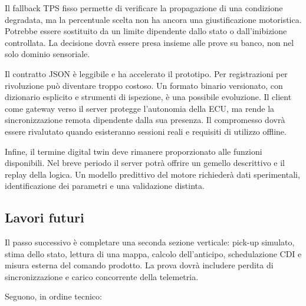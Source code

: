 \documentclass{article}
\begin{document}
Il fallback TPS fisso permette di verificare la propagazione di una condizione
degradata, ma la percentuale scelta non ha ancora una giustificazione
motoristica. Potrebbe essere sostituito da un limite dipendente dallo stato o
dall'inibizione controllata. La decisione dovrà essere presa insieme alle prove
su banco, non nel solo dominio sensoriale.

Il contratto JSON è leggibile e ha accelerato il prototipo. Per registrazioni
per rivoluzione può diventare troppo costoso. Un formato binario versionato,
con dizionario esplicito e strumenti di ispezione, è una possibile evoluzione.
Il client come gateway verso il server protegge l'autonomia della ECU, ma rende
la sincronizzazione remota dipendente dalla sua presenza. Il compromesso dovrà
essere rivalutato quando esisteranno sessioni reali e requisiti di utilizzo
offline.

Infine, il termine digital twin deve rimanere proporzionato alle funzioni
disponibili. Nel breve periodo il server potrà offrire un gemello descrittivo e
il replay della logica. Un modello predittivo del motore richiederà dati
sperimentali, identificazione dei parametri e una validazione distinta.

\subsection{Lavori futuri}

Il passo successivo è completare una seconda sezione verticale: pick-up
simulato, stima dello stato, lettura di una mappa, calcolo dell'anticipo,
schedulazione CDI e misura esterna del comando prodotto. La prova dovrà includere
perdita di sincronizzazione e carico concorrente della telemetria.

Seguono, in ordine tecnico:
\end{document}
